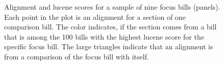 \documentclass[12pt]{article} %
\begin{document}
\begin{figure}[ht!]
    \caption{Alignment and lucene scores for a sample of nine focus bills (panels). Each point in the plot is an alignment for a section of one comparison bill. The color indicates, if the section comes from a bill that is among the 100 bills with the highest lucene score for the specific focus bill. The large triangles indicate that an alignment is from a comparison of the focus bill with itself.}
\label{fig:closest100} 
\end{figure}
\end{document}
